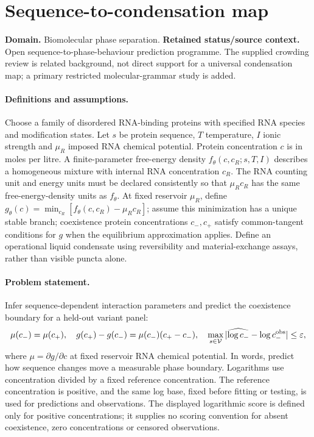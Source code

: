 \documentclass[11pt]{article}
\begin{document}
\section*{Sequence-to-condensation map}
\label{prob:005}
\label{rank:16}
\par\smallskip

\noindent\textbf{Domain.} Biomolecular phase separation. \quad \textbf{Retained status/source context.} Open sequence-to-phase-behaviour prediction programme. The supplied crowding review is related background, not direct support for a universal condensation map; a primary restricted molecular-grammar study is added.
\paragraph{Definitions and assumptions.} Choose a family of disordered RNA-binding proteins with specified RNA species and modification states. Let $s$ be protein sequence, $T$ temperature, $I$ ionic strength and $\mu_R$ imposed RNA chemical potential. Protein concentration $c$ is in moles per litre. A finite-parameter free-energy density $f_\theta(c,c_R;s,T,I)$ describes a homogeneous mixture with internal RNA concentration $c_R$. The RNA counting unit and energy units must be declared consistently so that $\mu_Rc_R$ has the same free-energy-density units as $f_\theta$. At fixed reservoir $\mu_R$, define $g_\theta(c)=\min_{c_R}[f_\theta(c,c_R)-\mu_Rc_R]$; assume this minimization has a unique stable branch; coexistence protein concentrations $c_-,c_+$ satisfy common-tangent conditions for $g$ when the equilibrium approximation applies. Define an operational liquid condensate using reversibility and material-exchange assays, rather than visible puncta alone.
\paragraph{Problem statement.} Infer sequence-dependent interaction parameters and predict the coexistence boundary for a held-out variant panel:
\[
\mu(c_-)=\mu(c_+),\quad
g(c_+)-g(c_-)=\mu(c_-)(c_+-c_-),\quad
\max_{s\in\mathcal V}|\widehat{\log c_-}-\log c_-^{\rm obs}|\leq\varepsilon,
\]
where $\mu=\partial g/\partial c$ at fixed reservoir RNA chemical potential. In words, predict how sequence changes move a measurable phase boundary. Logarithms use concentration divided by a fixed reference concentration. The reference concentration is positive, and the same log base, fixed before fitting or testing, is used for predictions and observations. The displayed logarithmic score is defined only for positive concentrations; it supplies no scoring convention for absent coexistence, zero concentrations or censored observations.
\end{document}
